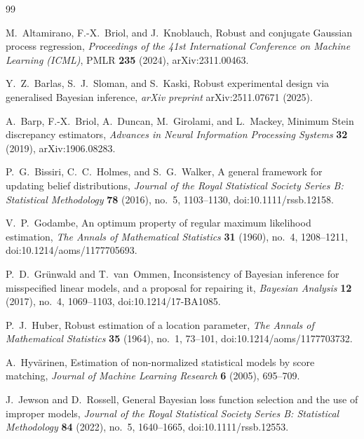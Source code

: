 \documentclass[11pt,a4paper,reqno]{amsart}
\theoremstyle{definition}
\theoremstyle{remark}
\begin{document}
\begin{thebibliography}{99}

M.~Altamirano, F.-X.~Briol, and J.~Knoblauch,
\newblock Robust and conjugate Gaussian process regression,
\newblock \emph{Proceedings of the 41st International Conference on Machine Learning (ICML)}, PMLR \textbf{235} (2024), arXiv:2311.00463.

Y.~Z.~Barlas, S.~J.~Sloman, and S.~Kaski,
\newblock Robust experimental design via generalised Bayesian inference,
\newblock \emph{arXiv preprint} arXiv:2511.07671 (2025).

A.~Barp, F.-X.~Briol, A.~Duncan, M.~Girolami, and L.~Mackey,
\newblock Minimum Stein discrepancy estimators,
\newblock \emph{Advances in Neural Information Processing Systems} \textbf{32} (2019), arXiv:1906.08283.

P.~G.~Bissiri, C.~C.~Holmes, and S.~G.~Walker,
\newblock A general framework for updating belief distributions,
\newblock \emph{Journal of the Royal Statistical Society Series B: Statistical Methodology} \textbf{78} (2016), no.~5, 1103--1130, doi:10.1111/rssb.12158.

V.~P.~Godambe,
\newblock An optimum property of regular maximum likelihood estimation,
\newblock \emph{The Annals of Mathematical Statistics} \textbf{31} (1960), no.~4, 1208--1211, doi:10.1214/aoms/1177705693.

P.~D.~Gr\"unwald and T.~van~Ommen,
\newblock Inconsistency of Bayesian inference for misspecified linear models, and a proposal for repairing it,
\newblock \emph{Bayesian Analysis} \textbf{12} (2017), no.~4, 1069--1103, doi:10.1214/17-BA1085.

P.~J.~Huber,
\newblock Robust estimation of a location parameter,
\newblock \emph{The Annals of Mathematical Statistics} \textbf{35} (1964), no.~1, 73--101, doi:10.1214/aoms/1177703732.

A.~Hyv\"arinen,
\newblock Estimation of non-normalized statistical models by score matching,
\newblock \emph{Journal of Machine Learning Research} \textbf{6} (2005), 695--709.

J.~Jewson and D.~Rossell,
\newblock General Bayesian loss function selection and the use of improper models,
\newblock \emph{Journal of the Royal Statistical Society Series B: Statistical Methodology} \textbf{84} (2022), no.~5, 1640--1665, doi:10.1111/rssb.12553.


\end{thebibliography}
\end{document}

